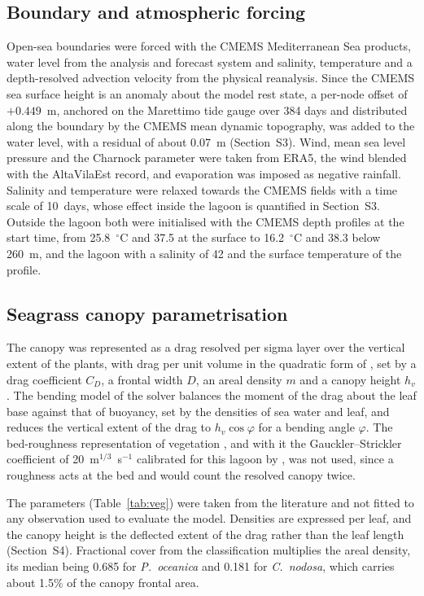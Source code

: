 \subsection{Boundary and atmospheric forcing}
\label{sec:methods_forcing}

Open-sea boundaries were forced with the CMEMS Mediterranean Sea products,
water level from the analysis and forecast system and salinity, temperature
and a depth-resolved advection velocity from the physical reanalysis. Since
the CMEMS sea surface height is an anomaly about the model rest state, a
per-node offset of $+0.449$~m, anchored on the Marettimo tide gauge over 384
days and distributed along the boundary by the CMEMS mean dynamic topography,
was added to the water level, with a residual of about 0.07~m (Section~S3).
Wind, mean sea level pressure and the Charnock parameter were taken from ERA5,
the wind blended with the AltaVilaEst record, and evaporation was imposed as
negative rainfall. Salinity and temperature were relaxed towards the CMEMS
fields with a time scale of 10~days, whose effect inside the lagoon is
quantified in Section~S3. Outside the lagoon both were initialised
with the CMEMS depth profiles at the start time, from 25.8~$^\circ$C and 37.5
at the surface to 16.2~$^\circ$C and 38.3 below 260~m, and the lagoon with a
salinity of 42 and the surface temperature of the profile.

\subsection{Seagrass canopy parametrisation}
\label{sec:methods_roughness}

The canopy was represented as a drag resolved per sigma layer over the
vertical extent of the plants, with drag per unit volume in the quadratic form
of \citet{Nepf2012}, set by a drag coefficient $C_D$, a frontal width $D$, an
areal density $m$ and a canopy height $h_v$. The bending model of the solver
balances the moment of the drag about the leaf base against that of buoyancy,
set by the densities of sea water and leaf, and reduces the vertical extent of
the drag to $h_v \cos\varphi$ for a bending angle $\varphi$. The bed-roughness
representation of vegetation \citep{Baptist2007}, and with it the
Gauckler--Strickler coefficient of 20~m$^{1/3}$~s$^{-1}$ calibrated for this
lagoon by \citet{Ingrassia2024}, was not used, since a roughness acts at the
bed and would count the resolved canopy twice.

The parameters (Table~\ref{tab:veg}) were taken from the literature and not
fitted to any observation used to evaluate the model. Densities are expressed
per leaf, and the canopy height is the deflected extent of the drag rather
than the leaf length (Section~S4). Fractional cover from the classification
multiplies the areal density, its median being 0.685 for \emph{P.\ oceanica}
and 0.181 for \emph{C.\ nodosa}, which carries about 1.5\% of the canopy
frontal area.


